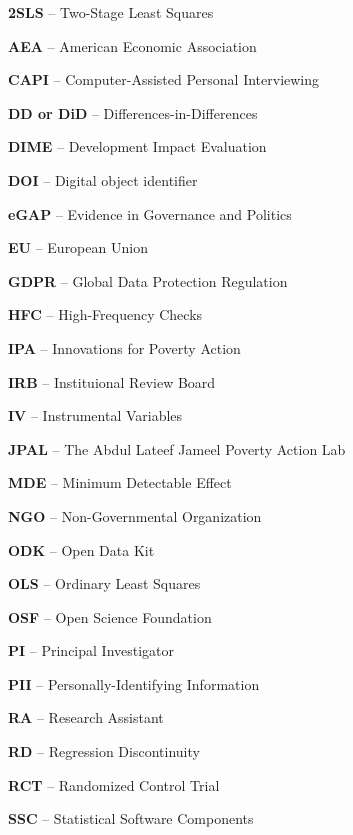 \noindent\textbf{2SLS} -- Two-Stage Least Squares

\noindent\textbf{AEA} -- American Economic Association

\noindent\textbf{CAPI} -- Computer-Assisted Personal Interviewing

\noindent\textbf{DD or DiD} -- Differences-in-Differences

\noindent\textbf{DIME} -- Development Impact Evaluation

\noindent\textbf{DOI} -- Digital object identifier

\noindent\textbf{eGAP} -- Evidence in Governance and Politics

\noindent\textbf{EU} -- European Union

\noindent\textbf{GDPR} -- Global Data Protection Regulation

\noindent\textbf{HFC} -- High-Frequency Checks

\noindent\textbf{IPA} -- Innovations for Poverty Action

\noindent\textbf{IRB} -- Instituional Review Board

\noindent\textbf{IV} -- Instrumental Variables

\noindent\textbf{JPAL} -- The Abdul Lateef Jameel Poverty Action Lab

\noindent\textbf{MDE} -- Minimum Detectable Effect

\noindent\textbf{NGO} -- Non-Governmental Organization

\noindent\textbf{ODK} -- Open Data Kit

\noindent\textbf{OLS} -- Ordinary Least Squares

\noindent\textbf{OSF} -- Open Science Foundation

\noindent\textbf{PI} -- Principal Investigator

\noindent\textbf{PII} -- Personally-Identifying Information

\noindent\textbf{RA} -- Research Assistant

\noindent\textbf{RD} -- Regression Discontinuity

\noindent\textbf{RCT} -- Randomized Control Trial

\noindent\textbf{SSC} -- Statistical Software Components
